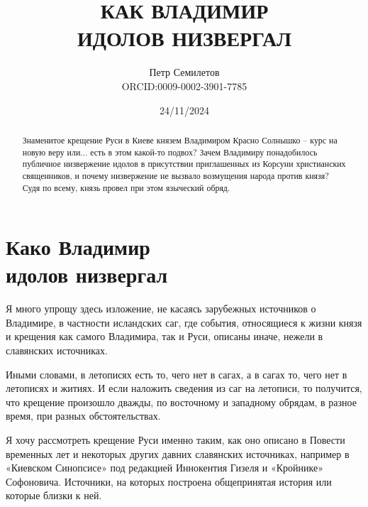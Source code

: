 \documentclass[a5paper,11pt,openany]{article}
\title{КАК ВЛАДИМИР\\  ИДОЛОВ НИЗВЕРГАЛ\\
\textsmaller[2]{редакция 1.0}}
\author{Петр Семилетов\\ORCID:0009-0002-3901-7785 \orcidlink{0009-0002-3901-7785}}
\date{24/11/2024}
\begin{document}
\maketitle

\pagestyle{empty}


\newpage

\pagestyle{plain}



%
%
%

\begin{abstract}
Знаменитое крещение Руси в Киеве князем Владимиром Красно Солнышко – курс на новую веру или... есть в этом какой-то подвох? Зачем Владимиру понадобилось публичное низвержение идолов в присутствии приглашенных из Корсуни христианских священников, и почему низвержение не вызвало возмущения народа против князя? Судя по всему, князь провел при этом языческий обряд.
\end{abstract}


\section{Како Владимир\\ идолов низвергал}

Я много упрощу здесь изложение, не касаясь зарубежных источников о Владимире, в частности исландских саг, где события, относящиеся к жизни князя и крещения как самого Владимира, так и Руси, описаны иначе, нежели в славянских источниках.

Иными словами, в летописях есть то, чего нет в сагах, а в сагах то, чего нет в летописях и житиях. И если наложить сведения из саг на летописи, то получится, что крещение произошло дважды, по восточному и западному обрядам, в разное время, при разных обстоятельствах. 


Я хочу рассмотреть крещение Руси именно таким, как оно описано в Повести временных лет и некоторых других давних славянских источниках, например в «Киевском Синопсисе»\cite{sinopsis} под редакцией Иннокентия Гизеля и «Кройнике»\cite{sofonovich01} Софоновича. Источники, на которых построена общепринятая история или которые близки к ней.
\end{document}
